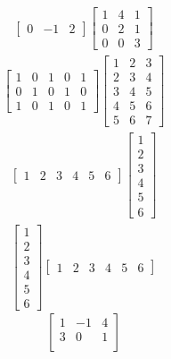 \begin{tasks}[resume, style=enumerate]
\begin{align*}
\begin{bmatrix}
      0 & -1 & 2
    \end{bmatrix}
    \begin{bmatrix}
      1 & 4 & 1 \\
      0 & 2 & 1 \\
      0 & 0 & 3
    \end{bmatrix}
  \end{align*}
\task
  \begin{align*}
    \begin{bmatrix}
      1 & 0 & 1 & 0 & 1 \\
      0 & 1 & 0 & 1 & 0 \\
      1 & 0 & 1 & 0 & 1
    \end{bmatrix}
    \begin{bmatrix}
      1 & 2 & 3 \\
      2 & 3 & 4 \\
      3 & 4 & 5 \\
      4 & 5 & 6 \\
      5 & 6 & 7
    \end{bmatrix}
  \end{align*}
\task
  \begin{align*}
    \begin{bmatrix}
      1 & 2 & 3 & 4 & 5 & 6
    \end{bmatrix}
    \begin{bmatrix}
      1 \\ 2 \\ 3 \\ 4 \\ 5 \\ 6
    \end{bmatrix}
  \end{align*}
\task
  \begin{align*}
    \begin{bmatrix}
      1 \\ 2 \\ 3 \\ 4 \\ 5 \\ 6
    \end{bmatrix}
    \begin{bmatrix}
      1 & 2 & 3 & 4 & 5 & 6
    \end{bmatrix}
  \end{align*}
\task
  \begin{displaymath}
    \begin{bmatrix}
      1 & -1 & 4 \\
      3 & 0 & 1 \\

\end{bmatrix}
\end{displaymath}
\end{tasks}
